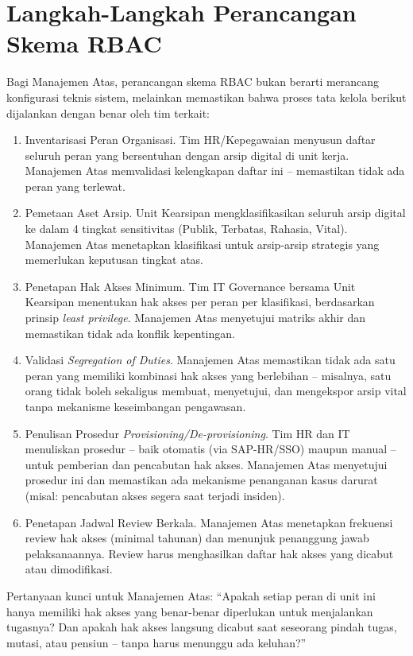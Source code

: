 \documentclass[12pt,a4paper]{report}
\begin{document}
\section{Langkah-Langkah Perancangan Skema RBAC}
Bagi Manajemen Atas, perancangan skema RBAC bukan berarti merancang konfigurasi teknis sistem, melainkan memastikan bahwa proses tata kelola berikut dijalankan dengan benar oleh tim terkait:

\begin{enumerate}[leftmargin=*]
    \item Inventarisasi Peran Organisasi. Tim HR/Kepegawaian menyusun daftar seluruh peran yang bersentuhan dengan arsip digital di unit kerja. Manajemen Atas memvalidasi kelengkapan daftar ini -- memastikan tidak ada peran yang terlewat.
    \item Pemetaan Aset Arsip. Unit Kearsipan mengklasifikasikan seluruh arsip digital ke dalam 4 tingkat sensitivitas (Publik, Terbatas, Rahasia, Vital). Manajemen Atas menetapkan klasifikasi untuk arsip-arsip strategis yang memerlukan keputusan tingkat atas.
    \item Penetapan Hak Akses Minimum. Tim IT Governance bersama Unit Kearsipan menentukan hak akses per peran per klasifikasi, berdasarkan prinsip \textit{least privilege}. Manajemen Atas menyetujui matriks akhir dan memastikan tidak ada konflik kepentingan.
    \item Validasi \textit{Segregation of Duties}. Manajemen Atas memastikan tidak ada satu peran yang memiliki kombinasi hak akses yang berlebihan -- misalnya, satu orang tidak boleh sekaligus membuat, menyetujui, dan mengekspor arsip vital tanpa mekanisme keseimbangan pengawasan.
    \item Penulisan Prosedur \textit{Provisioning/De-provisioning}. Tim HR dan IT menuliskan prosedur -- baik otomatis (via SAP-HR/SSO) maupun manual -- untuk pemberian dan pencabutan hak akses. Manajemen Atas menyetujui prosedur ini dan memastikan ada mekanisme penanganan kasus darurat (misal: pencabutan akses segera saat terjadi insiden).
    \item Penetapan Jadwal Review Berkala. Manajemen Atas menetapkan frekuensi review hak akses (minimal tahunan) dan menunjuk penanggung jawab pelaksanaannya. Review harus menghasilkan daftar hak akses yang dicabut atau dimodifikasi.
\end{enumerate}

Pertanyaan kunci untuk Manajemen Atas: ``Apakah setiap peran di unit ini hanya memiliki hak akses yang benar-benar diperlukan untuk menjalankan tugasnya? Dan apakah hak akses langsung dicabut saat seseorang pindah tugas, mutasi, atau pensiun -- tanpa harus menunggu ada keluhan?''
\end{document}
